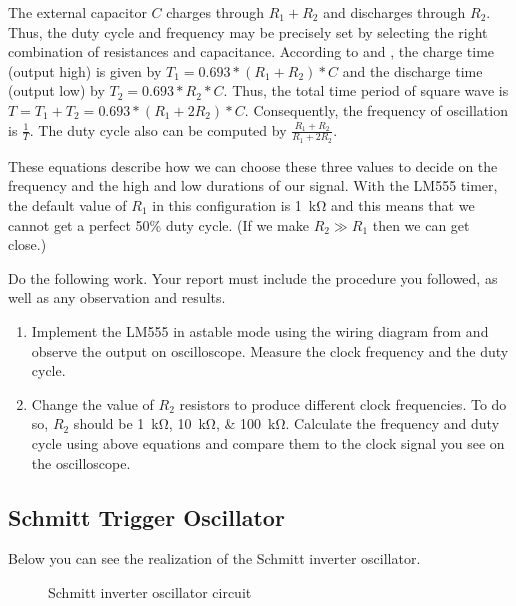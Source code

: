 \documentclass[12pt, logo=tehranDLDL/ut]{tehranDLDL}
\begin{document}
The external capacitor $C$ charges through $R_1 + R_2$ and discharges through $R_2$. Thus, the duty cycle and frequency may be precisely set by selecting the right combination of resistances and capacitance. According to  and , the charge time (output high) is given by $T_1 =0.693 * (R_1+ R_2) * C$ and the discharge time (output low) by $T_2 = 0.693 * R_2 * C$. Thus, the total time period of square wave is $T = T_1 + T_2 = 0.693 * (R_1 +2R_2) * C$. Consequently, the frequency of oscillation is $\frac{1}{T}$. The duty cycle also can be computed by $\frac{R_1 + R_2}{R_1 + 2 R_2}$.

These equations describe how we can choose these three values to decide on the frequency and the high and low durations of our signal. With the LM555 timer, the default value of $R_1$ in this configuration is \SI{1}{\kilo\ohm} and this means that we cannot get a perfect 50\% duty cycle. (If we make $R_2 \gg R_1$ then we can get close.)

Do the following work. Your report must include the procedure you followed, as well as any observation and results.

\begin{enumerate}
    \item Implement the LM555 in astable mode using the wiring diagram from  and observe the output on oscilloscope. Measure the clock frequency and the duty cycle.
    \item Change the value of $R_2$ resistors to produce different clock frequencies. To do so, $R_2$ should be \SIlist{1; 10; 100}{\kilo\ohm}. Calculate the frequency and duty cycle using above equations and compare them to the clock signal you see on the oscilloscope.
\end{enumerate}

\designverification{}

\subsection{Schmitt Trigger Oscillator}

Below you can see the realization of the Schmitt inverter oscillator.

\begin{figure}[b]
    \centering
    \caption{Schmitt inverter oscillator circuit\label{fig:schmitt}}

\end{figure}
\end{document}
